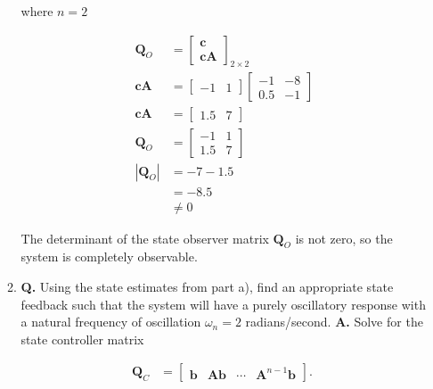 \documentclass[main.tex]{subfiles}
\begin{document}
\begin{enumerate}
\begin{enumerate}
        where $n=2$

        $$
        \begin{aligned}
        \textbf{Q}_O & = \left[\begin{array}{l}
        \textbf{c} \\
        \textbf{c} \textbf{A}
        \end{array}\right]_{2 \times 2} \\
        \textbf{c} \textbf{A} &= \left[\begin{array}{ll}
        -1 & 1
        \end{array}\right]\left[\begin{array}{ll}
        -1 & -8 \\
        0.5 & -1
        \end{array}\right] \\
        \textbf{c} \textbf{A} &= \left[\begin{array}{ll}
        1.5 & 7
        \end{array}\right] \\
        \textbf{Q}_O &= \left[\begin{array}{ll}
        -1 & 1 \\
        1.5 & 7
        \end{array}\right] \\ 
        |\textbf{Q}_O| &= -7 - 1.5 \\
        & = - 8.5 \\
        & \neq 0
        \end{aligned}
        $$

        The determinant of the state observer matrix $\textbf{Q}_O$ is not zero, so the system is completely observable. 
     
	    \item \textbf{Q.} Using the state estimates from part a), find an appropriate state feedback such that the system will have a purely oscillatory response with a natural frequency of oscillation $\omega_n = 2$ radians/second. \textbf{A.} Solve for the state controller matrix

        $$
        \begin{aligned}
        \textbf{Q}_C &= \left[\begin{array}{llll}
        \textbf{b} & \textbf{A}\textbf{b} & \cdots &  \textbf{A}^{n-1} \textbf{b}
        \end{array}\right] \text {. }
        \end{aligned}
        $$


\end{enumerate}
\end{enumerate}
\end{document}
